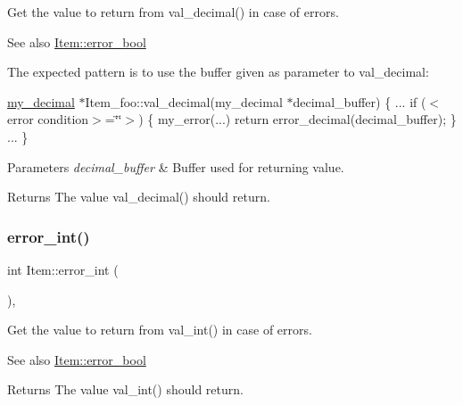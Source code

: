Get the value to return from val\+\_\+decimal() in case of errors.

\begin{DoxySeeAlso}{See also}
\mbox{\hyperlink{classItem_a45c8c303465b71321c15ae43583de83f}{Item\+::error\+\_\+bool}}
\end{DoxySeeAlso}
The expected pattern is to use the buffer given as parameter to val\+\_\+decimal\+:

\mbox{\hyperlink{classmy__decimal}{my\+\_\+decimal}} $\ast$\+Item\+\_\+foo\+::val\+\_\+decimal(my\+\_\+decimal $\ast$decimal\+\_\+buffer) \{ ... if ($<$error condition$>$=\char`\"{}\char`\"{}$>$) \{ my\+\_\+error(...) return error\+\_\+decimal(decimal\+\_\+buffer); \} ... \}


\begin{DoxyParams}{Parameters}
{\em decimal\+\_\+buffer} & Buffer used for returning value.\\
\hline
\end{DoxyParams}
\begin{DoxyReturn}{Returns}
The value val\+\_\+decimal() should return. 
\end{DoxyReturn}
\mbox{\label{classItem_a115c9bc7c78e1ec851df24e1c934e44f}} 
\subsubsection{\texorpdfstring{error\+\_\+int()}{error\_int()}}
{\footnotesize\ttfamily int Item\+::error\+\_\+int (\begin{DoxyParamCaption}{ }\end{DoxyParamCaption})\hspace{0.3cm}{\ttfamily [inline]}, {\ttfamily [protected]}}

Get the value to return from val\+\_\+int() in case of errors.

\begin{DoxySeeAlso}{See also}
\mbox{\hyperlink{classItem_a45c8c303465b71321c15ae43583de83f}{Item\+::error\+\_\+bool}}
\end{DoxySeeAlso}
\begin{DoxyReturn}{Returns}
The value val\+\_\+int() should return. 
\end{DoxyReturn}
\mbox{\label{classItem_a3514d1992e60ef2d018eba61fc5ff269}} 
